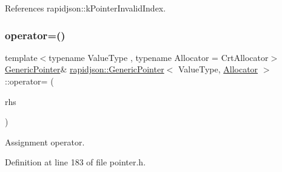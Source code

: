 References rapidjson\+::k\+Pointer\+Invalid\+Index.

\mbox{\label{classrapidjson_1_1_generic_pointer_a23194bb6ce6c07c78981344fe80ac3a6}} 
\subsubsection{\texorpdfstring{operator=()}{operator=()}}
{\footnotesize\ttfamily template$<$typename Value\+Type , typename Allocator  = Crt\+Allocator$>$ \\
\mbox{\hyperlink{classrapidjson_1_1_generic_pointer}{Generic\+Pointer}}\& \mbox{\hyperlink{classrapidjson_1_1_generic_pointer}{rapidjson\+::\+Generic\+Pointer}}$<$ Value\+Type, \mbox{\hyperlink{classrapidjson_1_1_allocator}{Allocator}} $>$\+::operator= (\begin{DoxyParamCaption}\item[{const \mbox{\hyperlink{classrapidjson_1_1_generic_pointer}{Generic\+Pointer}}$<$ Value\+Type, \mbox{\hyperlink{classrapidjson_1_1_allocator}{Allocator}} $>$ \&}]{rhs }\end{DoxyParamCaption})}



Assignment operator. 



Definition at line 183 of file pointer.\+h.


